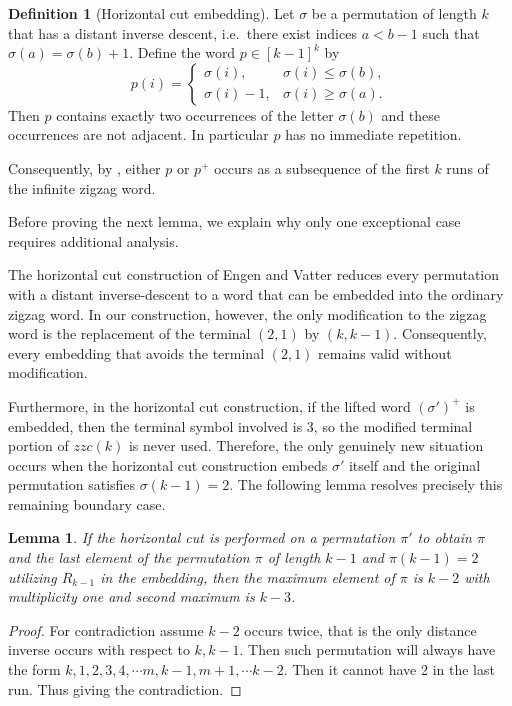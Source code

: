 \documentclass[a4paper,12pt]{article}
\newtheorem{lemma}[theorem]{Lemma}
\theoremstyle{definition}
\newtheorem{definition}[theorem]{Definition}
\numberwithin{equation}{section}
\begin{document}
\begin{definition}[Horizontal cut embedding]\label{lem:horizontal-cut}
Let $\sigma$ be a permutation of length $k$ that has a distant inverse
descent, i.e.\ there exist indices $a<b-1$ such that
$\sigma(a)=\sigma(b)+1$.  Define the word $p\in [k-1]^k$ by
\[
p(i)=
\begin{cases}
\sigma(i), & \sigma(i)\le \sigma(b),\\
\sigma(i)-1, & \sigma(i)\ge \sigma(a).
\end{cases}
\]
Then $p$ contains exactly two occurrences of the letter $\sigma(b)$
and these occurrences are not adjacent.  In particular $p$ has no
immediate repetition.

Consequently, by \cite[Proposition 10]{engen2020containing}, either $p$ or $p^{+}$ occurs as a subsequence of the first $k$ runs of the infinite zigzag word.
\end{definition}




Before proving the next lemma, we explain why only one exceptional case requires additional analysis.

The horizontal cut construction of Engen and Vatter \cite{engen2020containing} reduces every permutation with a distant inverse-descent to a word that can be embedded into the ordinary zigzag word. In our construction, however, the only modification to the zigzag word is the replacement of the terminal $(2,1)$ by $(k,k-1)$. Consequently, every embedding that avoids the terminal $(2,1)$ remains valid without modification.

Furthermore, in the horizontal cut construction, if the lifted word $(\sigma')^+$ is embedded, then the terminal symbol involved is $3$, so the modified terminal portion of $zzc(k)$ is never used. Therefore, the only genuinely new situation occurs when the horizontal cut construction embeds $\sigma'$ itself and the original permutation satisfies $\sigma(k-1)=2$. The following lemma resolves precisely this remaining boundary case.

\begin{lemma}\label{h_cut_max}
    If the horizontal cut is performed on a permutation $\pi'$ to obtain $\pi$ and the last element of the permutation $\pi$ of length $k-1$ and $\pi(k-1) =2$ utilizing $R_{k-1}$ in the embedding, then the maximum element of $\pi$ is $k-2$ with multiplicity one and second maximum is $k-3$.  
\end{lemma}
\begin{proof}
    For contradiction assume $k-2$ occurs twice, that is the only distance inverse occurs with respect to $k,k-1$. Then such permutation will always have the form $k , 1,2,3,4, \cdots m , k-1,m+1, \cdots k-2$. Then it cannot have 2 in the last run. Thus giving the contradiction.  
\end{proof}
\end{document}
